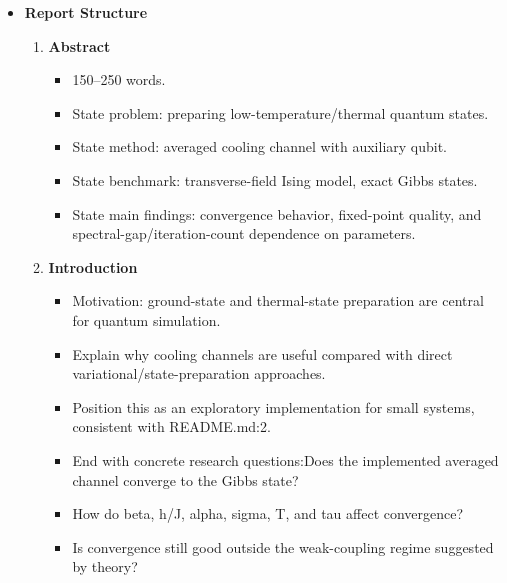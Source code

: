 \documentclass[11pt,a4paper]{article}
\begin{document}
\begin{itemize}
  \item \textbf{Report Structure}
  \begin{enumerate}
    \item \textbf{Abstract}
    \begin{itemize}
      \item 150–250 words.
      \item State problem: preparing low-temperature/thermal quantum states.
      \item State method: averaged cooling channel with auxiliary qubit.
      \item State benchmark: transverse-field Ising model, exact Gibbs states.
      \item State main findings: convergence behavior, fixed-point quality, and spectral-gap/iteration-count dependence on parameters.
    \end{itemize}

    \item \textbf{Introduction}
    \begin{itemize}
      \item Motivation: ground-state and thermal-state preparation are central for quantum simulation.
      \item Explain why cooling channels are useful compared with direct variational/state-preparation approaches.
      \item Position this as an exploratory implementation for small systems, consistent with README.md:2.
      \item End with concrete research questions:Does the implemented averaged channel converge to the Gibbs state?
      \item How do beta, h/J, alpha, sigma, T, and tau affect convergence?
      \item Is convergence still good outside the weak-coupling regime suggested by theory?
    \end{itemize}


\end{enumerate}
\end{itemize}
\end{document}
